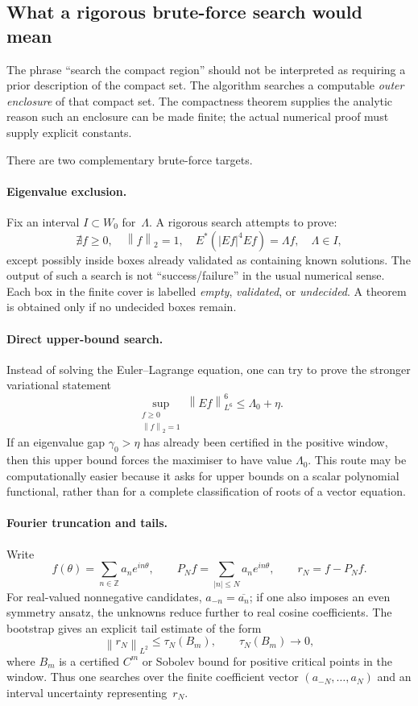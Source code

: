 \documentclass[12pt]{article}
\theoremstyle{definition}
\theoremstyle{remark}
\newcommand{\Z}{\mathbb{Z}}
\newcommand{\norm}[1]{\left\|#1\right\|}
\begin{document}
\subsection{What a rigorous brute-force search would mean}
\label{sec:bruteforce-search}

The phrase ``search the compact region'' should not be interpreted as
requiring a prior description of the compact set.  The algorithm searches
a computable \emph{outer enclosure} of that compact set.  The compactness
theorem supplies the analytic reason such an enclosure can be made finite;
the actual numerical proof must supply explicit constants.

There are two complementary brute-force targets.

\paragraph{Eigenvalue exclusion.}
Fix an interval $I\subset W_0$ for~$\Lambda$.  A rigorous search attempts
to prove:
\[
  \nexists f\geq0,\quad \norm{f}_2=1,\quad
  E^*(|Ef|^4Ef)=\Lambda f,\quad \Lambda\in I,
\]
except possibly inside boxes already validated as containing known
solutions.  The output of such a search is not ``success/failure'' in the
usual numerical sense.  Each box in the finite cover is labelled
\emph{empty}, \emph{validated}, or \emph{undecided}.  A theorem is obtained
only if no undecided boxes remain.

\paragraph{Direct upper-bound search.}
Instead of solving the Euler--Lagrange equation, one can try to prove the
stronger variational statement
\[
  \sup_{\substack{f\geq0\\ \norm{f}_2=1}}
  \norm{Ef}_{L^6}^6
  \leq \Lambda_0+\eta.
\]
If an eigenvalue gap $\gamma_0>\eta$ has already been certified in the
positive window, then this upper bound forces the maximiser to have value
$\Lambda_0$.  This route may be computationally easier because it asks for
upper bounds on a scalar polynomial functional, rather than for a complete
classification of roots of a vector equation.

\paragraph{Fourier truncation and tails.}
Write
\[
  f(\theta)=\sum_{n\in\Z}a_ne^{in\theta},\qquad
  P_Nf=\sum_{|n|\leq N}a_ne^{in\theta},\qquad r_N=f-P_Nf.
\]
For real-valued nonnegative candidates, $a_{-n}=\overline{a_n}$; if one
also imposes an even symmetry ansatz, the unknowns reduce further to real
cosine coefficients.  The bootstrap gives an explicit tail estimate of
the form
\[
  \norm{r_N}_{L^2}\leq \tau_N(B_m),
  \qquad
  \tau_N(B_m)\to0,
\]
where $B_m$ is a certified $C^m$ or Sobolev bound for positive critical
points in the window.  Thus one searches over the finite coefficient vector
$(a_{-N},\ldots,a_N)$ and an interval uncertainty representing~$r_N$.
\end{document}
